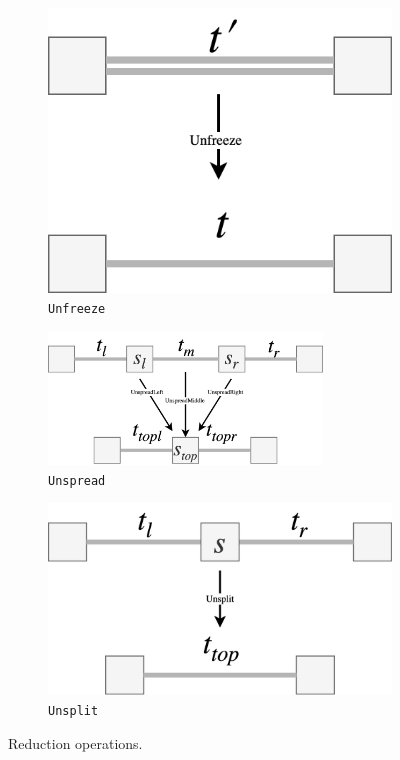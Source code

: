 \documentclass[12pt,a4paper,twoside,openright]{report}
\theoremstyle{definition}
\begin{document}
\begin{figure}[h]
  \centering
  \begin{subfigure}[t]{.2\textwidth}
    \centering\includegraphics[keepaspectratio,width=\textwidth]{impl/eval/unfreeze.png}
    \caption{\texttt{Unfreeze}}
    \label{fig:splitOp}
  \end{subfigure}
  \begin{subfigure}[t]{.43\textwidth}
    \centering\includegraphics[keepaspectratio,width=0.8\textwidth]{impl/eval/unspread.png}
    \caption{\texttt{Unspread}}
    \label{fig:spreadOP}
  \end{subfigure}
  \begin{subfigure}[t]{.3\textwidth}
    \centering\includegraphics[keepaspectratio,width=\textwidth]{impl/eval/unsplit.png}
    \caption{\texttt{Unsplit}}
    \label{fig:freezeOp}
  \end{subfigure}

  \captionsetup{width=.9\linewidth}
  \caption{Reduction operations.}
  \label{fig:evalOps}
\end{figure}
\end{document}
